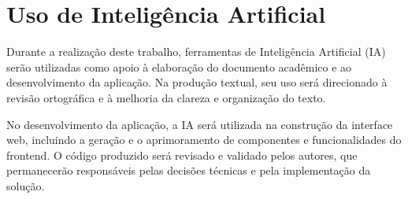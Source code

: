\section{Uso de Inteligência Artificial}

Durante a realização deste trabalho, ferramentas de Inteligência Artificial (IA) serão utilizadas como apoio à elaboração do documento acadêmico e ao desenvolvimento da aplicação. Na produção textual, seu uso será direcionado à revisão ortográfica e à melhoria da clareza e organização do texto. 

No desenvolvimento da aplicação, a IA será utilizada na construção da interface web, incluindo a geração e o aprimoramento de componentes e funcionalidades do frontend. O código produzido será revisado e validado pelos autores, que permanecerão responsáveis pelas decisões técnicas e pela implementação da solução.